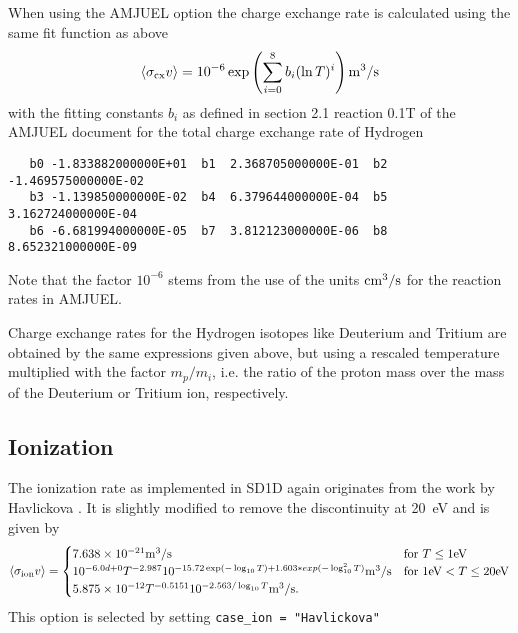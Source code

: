 \documentclass[amsmath,amssymb,a4]{revtex4}
\begin{document}
When using the AMJUEL option the charge exchange rate is calculated using the same fit function as above
\begin{equation}\label{charge_exchange_AMJUEL}
    \langle\sigma_{\rm cx} v\rangle = 10^{-6} \exp\left( \sum_{i=0}^8 b_i (\ln T)^i \right)  {\rm m}^3/{\rm s}
\end{equation}
with the fitting constants $b_i$ as defined in section 2.1 reaction 0.1T of the AMJUEL document for the total charge exchange rate of Hydrogen~\cite{EIRENE}
\begin{small}\begin{verbatim}
   b0 -1.833882000000E+01  b1  2.368705000000E-01  b2 -1.469575000000E-02
   b3 -1.139850000000E-02  b4  6.379644000000E-04  b5  3.162724000000E-04
   b6 -6.681994000000E-05  b7  3.812123000000E-06  b8  8.652321000000E-09
\end{verbatim}\end{small}
Note that the factor $10^{-6}$ stems from the use of the units ${\rm cm}^3/{\rm s}$ for the reaction rates in AMJUEL.

Charge exchange rates for the Hydrogen isotopes like Deuterium and Tritium are obtained by the same expressions given above, but using a rescaled temperature multiplied with the factor $m_p/m_i$, i.e. the ratio of the proton mass over the mass of the Deuterium or Tritium ion, respectively.


\subsection{Ionization}

The ionization rate as implemented in SD1D again originates from the work by Havlickova \cite{havlickova2013}. It is slightly modified to remove the discontinuity at 20~eV and is given by \cite{SD1D}
\begin{equation}\label{ionization_SD1D}
    \langle\sigma_{\rm ion} v\rangle = \begin{cases} 7.638 \times 10^{-21} {\rm m}^3/{\rm s}             & \mbox{for } T \le 1 {\rm eV} \\
                                        10^{-6.0d+0} T^{-2.987} 10^{-15.72 \exp(-\log_{10}T) + 1.603*exp(-\log_{10}^2T)} {\rm m}^3/{\rm s} & \mbox{for } 1 {\rm eV} < T \le 20 {\rm eV} \\
                                        5.875 \times 10^{-12} T^{-0.5151} 10^{-2.563/\log_{10}T} {\rm m}^3/{\rm s}. \end{cases}
\end{equation}
This option is selected by setting {\tt case\_ion = "Havlickova"}
\end{document}
